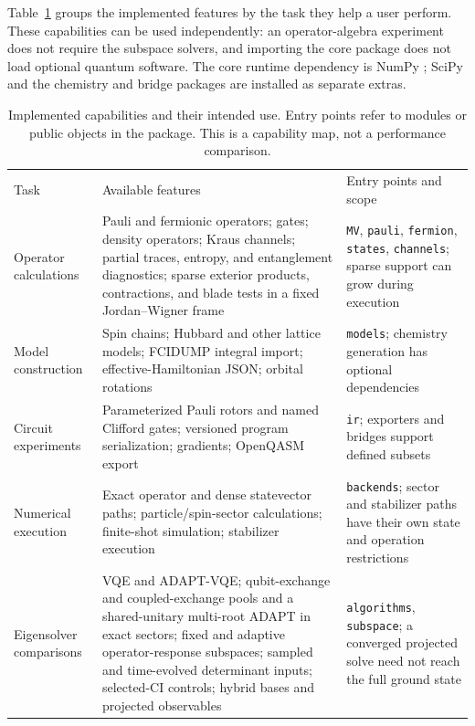 \documentclass[aps,pra,reprint,superscriptaddress,nofootinbib,floatfix,
  showkeys]{revtex4-2}
\begin{document}
Table~\ref{tab:features} groups the implemented features by the task they help a
user perform. These capabilities can be used independently: an operator-algebra
experiment does not require the subspace solvers, and importing the core package
does not load optional quantum software. The core runtime dependency is NumPy
\cite{harris2020numpy}; SciPy \cite{virtanen2020scipy} and the chemistry and
bridge packages are installed as separate extras.

\begin{table}
  \caption{Implemented capabilities and their intended use. Entry points refer
  to modules or public objects in the package. This is a capability map, not a
  performance comparison.}
  \label{tab:features}
  \footnotesize
  \begin{ruledtabular}
  \begin{tabular}{p{}p{}p{}}
Task & Available features & Entry points and scope\\
\colrule Operator calculations & Pauli and fermionic operators; gates; density operators; Kraus channels; partial traces, entropy, and entanglement diagnostics; sparse exterior products, contractions, and blade tests in a fixed Jordan--Wigner frame & \texttt{MV}, \texttt{pauli}, \texttt{fermion}, \texttt{states}, \texttt{channels}; sparse support can grow during execution\\
Model construction & Spin chains; Hubbard and other lattice models; FCIDUMP integral import; effective-Hamiltonian JSON; orbital rotations & \texttt{models}; chemistry generation has optional dependencies\\
Circuit experiments & Parameterized Pauli rotors and named Clifford gates; versioned program serialization; gradients; OpenQASM export & \texttt{ir}; exporters and bridges support defined subsets\\
Numerical execution & Exact operator and dense statevector paths; particle/spin-sector calculations; finite-shot simulation; stabilizer execution & \texttt{backends}; sector and stabilizer paths have their own state and operation restrictions\\
Eigensolver comparisons & VQE and ADAPT-VQE; qubit-exchange and coupled-exchange pools and a shared-unitary multi-root ADAPT in exact sectors; fixed and adaptive operator-response subspaces; sampled and time-evolved determinant inputs; selected-CI controls; hybrid bases and projected observables & \texttt{algorithms}, \texttt{subspace}; a converged projected solve need not reach the full ground state\\

\end{tabular}
\end{ruledtabular}
\end{table}
\end{document}
